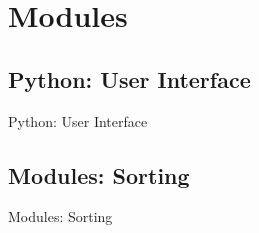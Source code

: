 \documentclass{beamer}
\begin{document}
\section{Modules}
\subsection{Python: User Interface}
\begin{frame}{Python: User Interface}
\end{frame}




\subsection{Modules: Sorting}
\begin{frame}{Modules: Sorting}
\end{frame}
\end{document}
